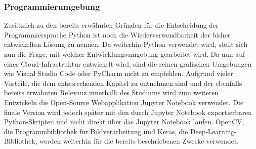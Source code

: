 \documentclass[12pt, a4paper]{scrbook}
\begin{document}
\subsubsection{Programmierumgebung}
Zusätzlich zu den bereits erwähnten Gründen für die Entscheidung der Programmiersprache Python ist noch die Wiederverwendbarkeit der bisher entwickelten Lösung zu nennen. Da weiterhin Python verwendet wird, stellt sich nun die Frage, mit welcher Entwicklungsumgebung gearbeitet wird. Da nun auf einer Cloud-Infrastruktur entwickelt wird, sind die reinen grafischen Umgebungen wie Visual Studio Code oder PyCharm nicht zu empfehlen. Aufgrund vieler Vorteile, die dem entsprechenden Kapitel zu entnehmen sind und der ebenfalls bereits erwähnten Relevanz innerhalb des Studiums wird zum weiteren Entwickeln die Open-Source Webapplikation Jupyter Notebook verwendet. Die finale Version wird jedoch später mit den durch Jupyter Notebook exportierbaren Python-Skripten und nicht direkt über das Jupyter Notebook laufen. OpenCV, die Programmbibliothek für Bildverarbeitung und Keras, die Deep-Learning-Bibliothek, werden weiterhin für die bereits beschriebenen Zwecke verwendet.
\end{document}
